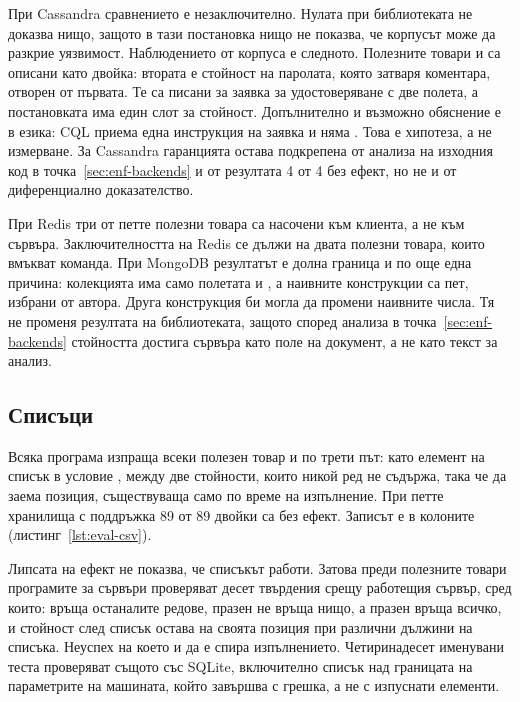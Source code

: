 При Cassandra сравнението е незаключително. Нулата при библиотеката не доказва
нищо, защото в тази постановка нищо не показва, че корпусът може да разкрие
уязвимост. Наблюдението от корпуса е следното. Полезните товари  и
 са описани като двойка: втората е стойност на паролата, която
затваря коментара, отворен от първата. Те са писани за заявка за удостоверяване с
две полета, а постановката има един слот за стойност. Допълнително и възможно
обяснение е в езика: CQL приема една инструкция на заявка и няма .
Това е хипотеза, а не измерване. За Cassandra гаранцията остава
подкрепена от анализа на изходния код в точка~\ref{sec:enf-backends} и от
резултата 4 от 4 без ефект, но не и от диференциално доказателство.

При Redis три от петте полезни товара са насочени към клиента, а не към сървъра.
Заключителността на Redis се дължи на двата полезни товара, които вмъкват команда.
При MongoDB резултатът е долна граница и по още една причина: колекцията има
само полетата  и , а наивните конструкции са пет, избрани от
автора. Друга конструкция би могла да промени наивните числа. Тя не променя
резултата на библиотеката, защото според анализа в точка~\ref{sec:enf-backends}
стойността достига сървъра като поле на документ, а не като текст за анализ.

\subsection{Списъци}
\label{sec:eval-lists}

Всяка програма изпраща всеки полезен товар и по трети път: като елемент на списък
в условие , между две стойности, които никой ред не съдържа, така че да
заема позиция, съществуваща само по време на изпълнение. При петте хранилища с
поддръжка 89 от 89 двойки са без ефект. Записът е в колоните
 (листинг~\ref{lst:eval-csv}).

Липсата на ефект не показва, че списъкът работи. Затова преди полезните товари
програмите за сървъри проверяват десет твърдения срещу работещия сървър, сред които:
 връща останалите редове, празен  не връща нищо, а празен
 връща всичко, и стойност след списък остава на своята позиция при
различни дължини на списъка. Неуспех на което и да е спира изпълнението.
Четиринадесет именувани теста проверяват същото със SQLite, включително списък
над границата на параметрите на машината, който завършва с грешка, а не с
изпуснати елементи.

